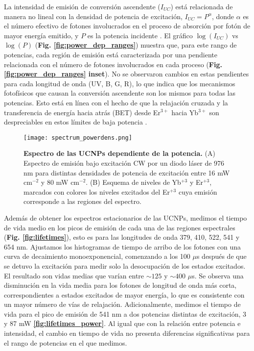 La intensidad de emisión de conversión ascendente ($I_{UC}$) está relacionada de manera no lineal con la densidad de potencia de excitación, $I_{UC} = P^\alpha$, donde $\alpha$ es el número efectivo de fotones involucrados en el proceso de absorción por fotón de mayor energía emitido, y $P$ es la potencia incidente \cite{Auzel2004}.  
El gráfico $\log{(I_{UC})}$ vs $\log{(P)}$ (\textbf{Fig. \ref{fig:power_dep_ranges}}) muestra que, para este rango de potencias, cada región de emisión está caracterizada por una pendiente relacionada con el número de fotones involucrados en cada proceso (\textbf{Fig. \ref{fig:power_dep_ranges} inset}).  
No se observaron cambios en estas pendientes para cada longitud de onda (UV, B, G, R), lo que indica que los mecanismos fotofísicos que causan la conversión ascendente son los mismos para todas las potencias.  
Esto está en línea con el hecho de que la relajación cruzada y la transferencia de energía hacia atrás (BET) desde Er$^{3+}$ hacia Yb$^{3+}$ son despreciables en estos límites de baja potencia \cite{suyver_anomalous_2005} \cite{berry_disputed_2015}.

\begin{figure}
    \centering
    \texttt{[image: spectrum\_powerdens.png]}
    \caption{\textbf{Espectro de las UCNPs dependiente de la potencia.} (A) Espectro de emisión bajo excitación CW por un diodo láser de 976 nm para distintas densidades de potencia de excitación entre 16 mW cm$^{-2}$ y 80 mW cm$^{-2}$.
    (B) Esquema de niveles de Yb$^{+3}$ y Er$^{+3}$, marcados con colores los niveles excitados del Er$^{+3}$ cuya emisión corresponde a las regiones del espectro.}
    \label{fig:power_dep_spectrum}
\end{figure}

Además de obtener los espectros estacionarios de las UCNPs, medimos el tiempo de vida medio en los picos de emisión de cada una de las regiones espectrales (\textbf{Fig. \ref{fig:lifetimes}}), esto es para las longitudes de onda 379, 410, 522, 541 y 654 nm.
Ajustamos los histogramas de tiempo de arribo de los fotones con una curva de decaimiento monoexponencial, comenzando a los 100 $\mu$s después de que se detuvo la excitación para medir solo la desocupación de los estados excitados.  
El resultado son vidas medias que varían entre $\sim125$ y $\sim400$ $\mu$s.  
Se observa una disminución en la vida media para los fotones de longitud de onda más corta, correspondientes a estados excitados de mayor energía, lo que es consistente con un mayor número de vías de relajación. 
Adicionalmente, medimos el tiempo de vida para el pico de emisión de 541 nm a dos potencias distintas de excitación, 3 y 87 mW \textbf{\ref{fig:lifetimes_power}}.
Al igual que con la relación entre potencia e intensidad, el cambio en tiempo de vida no presenta diferencias significativas para el rango de potencias en el que medimos.

